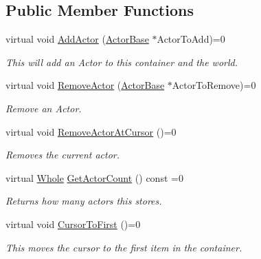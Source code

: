 \subsection*{Public Member Functions}
\begin{DoxyCompactItemize}
\item 
virtual void \hyperlink{classphys_1_1ActorContainerBase_a8dd213cba4915f68ac421fc9f341cbbe}{AddActor} (\hyperlink{classphys_1_1ActorBase}{ActorBase} $\ast$ActorToAdd)=0
\begin{DoxyCompactList}\small\item\em This will add an Actor to this container and the world. \item\end{DoxyCompactList}\item 
virtual void \hyperlink{classphys_1_1ActorContainerBase_a523072e42f6b581d044432f84a84ede4}{RemoveActor} (\hyperlink{classphys_1_1ActorBase}{ActorBase} $\ast$ActorToRemove)=0
\begin{DoxyCompactList}\small\item\em Remove an Actor. \item\end{DoxyCompactList}\item 
virtual void \hyperlink{classphys_1_1ActorContainerBase_a60f37a056e8750f3b389c5ceed14520c}{RemoveActorAtCursor} ()=0
\begin{DoxyCompactList}\small\item\em Removes the current actor. \item\end{DoxyCompactList}\item 
virtual \hyperlink{namespacephys_a460f6bc24c8dd347b05e0366ae34f34a}{Whole} \hyperlink{classphys_1_1ActorContainerBase_aa5ec651d4634b2d90efe2a76f9d2fbdd}{GetActorCount} () const =0
\begin{DoxyCompactList}\small\item\em Returns how many actors this stores. \item\end{DoxyCompactList}\item 
virtual void \hyperlink{classphys_1_1ActorContainerBase_ab1a44758d7c17e70ff2e0f8de47424c3}{CursorToFirst} ()=0
\begin{DoxyCompactList}\small\item\em This moves the cursor to the first item in the container. \item\end{DoxyCompactList}\item 

\end{DoxyCompactItemize}
